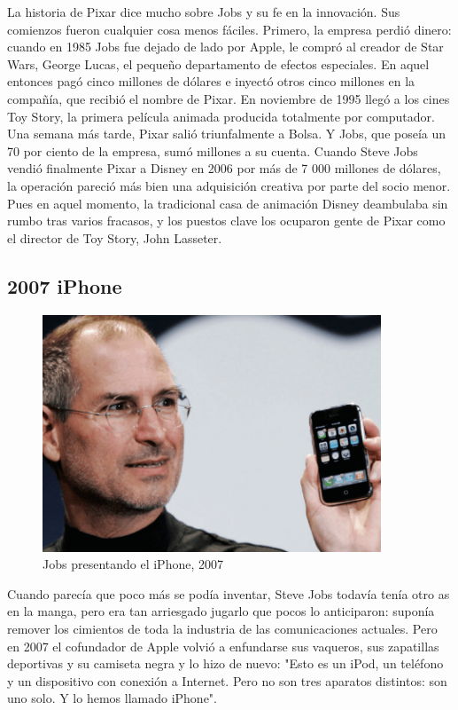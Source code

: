 \documentclass[notumble,10pt,a4paper]{leaflet}
\begin{document}
	La historia de Pixar dice mucho sobre Jobs y su fe en la innovación. Sus comienzos fueron cualquier cosa menos fáciles. Primero, la empresa perdió dinero: cuando en 1985 Jobs fue dejado de lado por Apple, le compró al creador de Star Wars, George Lucas, el pequeño departamento de efectos especiales. En aquel entonces pagó cinco millones de dólares e inyectó otros cinco millones en la compañía, que recibió el nombre de Pixar. 
	En noviembre de 1995 llegó a los cines Toy Story, la primera película animada producida totalmente por computador. Una semana más tarde, Pixar salió triunfalmente a Bolsa. Y Jobs, que poseía un 70 por ciento de la empresa, sumó millones a su cuenta. 
	Cuando Steve Jobs vendió finalmente Pixar a Disney en 2006 por más de 7 000 millones de dólares, la operación pareció más bien una adquisición creativa por parte del socio menor. Pues en aquel momento, la tradicional casa de animación Disney deambulaba sin rumbo tras varios fracasos, y los puestos clave los ocuparon gente de Pixar como el director de Toy Story, John Lasseter. 

\newpage
\subsection{\large{2007 iPhone}}
\begin{figure}[b]
	\centering
	\includegraphics[width=0.9\textwidth]{img/iphone.png}
	\caption{Jobs presentando el iPhone, 2007}
\end{figure}

	Cuando parecía que poco más se podía inventar, Steve Jobs todavía tenía otro as en la manga, pero era tan arriesgado jugarlo que pocos lo anticiparon: suponía remover los cimientos de toda la industria de las comunicaciones actuales.
	Pero en 2007 el cofundador de Apple volvió a enfundarse sus vaqueros, sus zapatillas deportivas y su camiseta negra y lo hizo de nuevo: "Esto es un iPod, un teléfono y un dispositivo con conexión a Internet. Pero no son tres aparatos distintos: son uno solo. Y lo hemos llamado iPhone".
\end{document}
